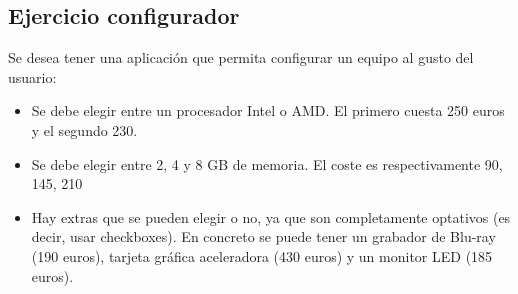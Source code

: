 \documentclass[letterpaper,10pt,spanish]{sphinxmanual}
\begin{document}
\subsection{Ejercicio configurador}
\label{tema4:ejercicio-configurador}
Se desea tener una aplicación que permita configurar un equipo al gusto del usuario:
\begin{itemize}
\item {} 
Se debe elegir entre un procesador Intel o AMD. El primero cuesta 250 euros y el segundo 230.

\item {} 
Se debe elegir entre 2, 4 y 8 GB de memoria. El coste es respectivamente 90, 145, 210

\item {} 
Hay extras que se pueden elegir o no, ya que son completamente optativos (es decir, usar checkboxes). En concreto se puede tener un grabador de Blu-ray (190 euros), tarjeta gráfica aceleradora (430 euros) y un monitor LED (185 euros).

\end{itemize}
\end{document}
